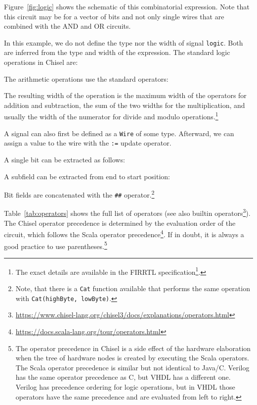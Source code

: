 \documentclass[%
    10pt,
    headinclude, footexclude,
    openright, %
    notitlepage,
    cleardoubleempty,
    headsepline,
    pointlessnumbers,
    bibtotoc, idxtotoc,
    ]{scrbook}
\newcommand{\code}[1]{{\small{\texttt{#1}}}}
\newcommand{\codefoot}[1]{{\footnotesize{\texttt{#1}}}}
\newcommand{\myref}[2]{\href{#1}{#2}}
\renewcommand{\myref}[2]{{#2}{\footnote{\url{#1}}}}
\begin{document}
Figure~\ref{fig:logic} shows the schematic of this combinatorial expression.
Note that this circuit may be for a vector of bits and not only single wires
that are combined with the AND and OR circuits.

In this example, we do not define the type nor the width of signal \code{logic}.
Both are inferred from the type and width of the expression.
The standard logic operations in Chisel are:



\noindent The arithmetic operations use the standard operators:



\noindent The resulting width of the operation is the maximum width of the operators for
addition and subtraction, the sum of the two widths for the multiplication, and usually
the width of the numerator for divide and modulo operations.\footnote{The exact
details are available in the \myref{https://github.com/freechipsproject/firrtl/blob/master/spec/spec.pdf}{FIRRTL specification}.}

A signal can also first be defined as a \code{Wire} of some type. Afterward, we can assign a
value to the wire with the \code{:=} update operator.


A single bit can be extracted as follows:

\noindent A subfield can be extracted from end to start position:

\noindent Bit fields are concatenated with the \code{\#\#} operator.\footnote{Note, that there is a \codefoot{Cat} function available that performs the same
operation with \codefoot{Cat(highByte, lowByte)}.}


Table~\ref{tab:operators} shows the full list of operators
(see also \myref{https://www.chisel-lang.org/chisel3/docs/explanations/operators.html}{builtin operators}).
The Chisel operator precedence is determined by the evaluation order of the circuit,
which follows the \myref{https://docs.scala-lang.org/tour/operators.html}{Scala operator precedence}.
If in doubt, it is always a good practice to use parentheses.\footnote{The operator precedence in
Chisel is a side effect of the hardware elaboration when the tree of hardware nodes
is created by executing the Scala operators. The Scala operator precedence is similar but
not identical to Java/C. Verilog has the same operator precedence as C, but VHDL
has a different one. Verilog has precedence ordering for logic operations, but in VHDL
those operators have the same precedence and are evaluated from left to right.}
\end{document}
